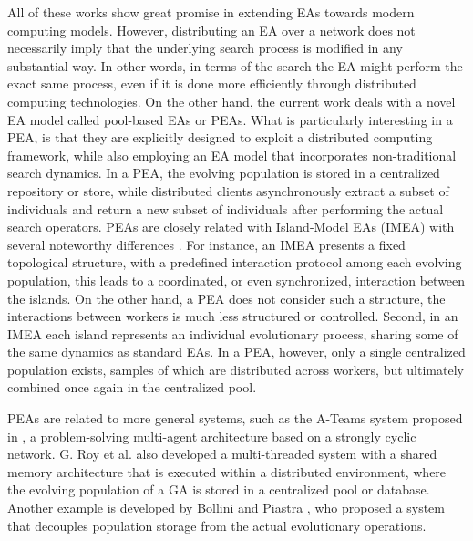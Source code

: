 All of these works show great promise in extending EAs towards modern computing models.
However, distributing an EA over a network does not necessarily imply that the underlying search process is modified in any substantial way.
In other words, in terms of the search the EA might perform the exact same process, even if it is done more efficiently through distributed computing technologies.
On the other hand, the current work deals with a novel EA model called pool-based EAs or PEAs.
What is particularly interesting in a PEA, is that they are explicitly designed to exploit a distributed computing framework, while also employing
an EA model that incorporates non-traditional search dynamics.
In a PEA, the evolving population is stored in a centralized repository or store, while distributed clients asynchronously extract a subset
of individuals and return a new subset of individuals after performing the actual search operators.
PEAs are closely related with Island-Model EAs (IMEA) \cite{cantu} with several noteworthy differences \cite{PoolvsIsland}.
For instance, an IMEA presents a fixed topological structure, with a predefined interaction protocol among each evolving population,
this leads to a coordinated, or even synchronized, interaction between the islands.
On the other hand, a PEA does not consider such a structure, the interactions between workers is much less structured or controlled.
Second, in an IMEA each island represents an individual evolutionary process, sharing some of the same dynamics as standard EAs.
In a PEA, however, only a single centralized population exists, samples of which are distributed across workers, but ultimately combined once again
in the centralized pool.

PEAs are related to more general systems, such as the A-Teams system proposed in \cite{ateam}, a problem-solving multi-agent architecture based on a strongly cyclic network.
G. Roy et al. \cite{roy:2009} also developed a multi-threaded system with a shared memory architecture that is executed within a distributed environment,
where the evolving population of a GA is stored in a centralized pool or database.
Another example is developed by Bollini and Piastra \cite{bollini:1999}, who proposed a system that decouples population storage from the actual evolutionary operations.

